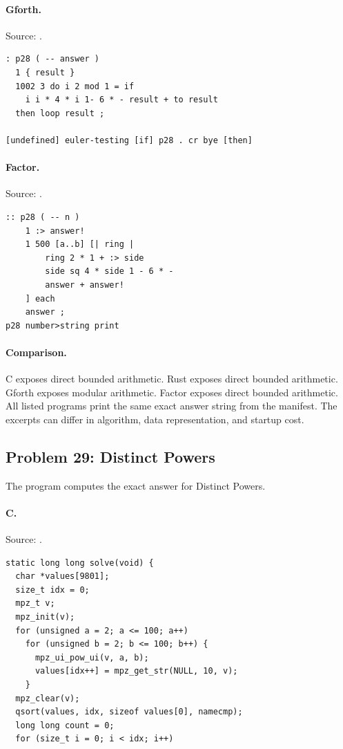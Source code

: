 \paragraph{Gforth.} Source: .
\begin{lstlisting}
: p28 ( -- answer )
  1 { result }
  1002 3 do i 2 mod 1 = if
    i i * 4 * i 1- 6 * - result + to result
  then loop result ;

[undefined] euler-testing [if] p28 . cr bye [then]
\end{lstlisting}

\paragraph{Factor.} Source: .
\begin{lstlisting}
:: p28 ( -- n )
    1 :> answer!
    1 500 [a..b] [| ring |
        ring 2 * 1 + :> side
        side sq 4 * side 1 - 6 * -
        answer + answer!
    ] each
    answer ;
p28 number>string print
\end{lstlisting}

\paragraph{Comparison.}
C exposes direct bounded arithmetic. Rust exposes direct bounded arithmetic. Gforth exposes modular arithmetic. Factor exposes direct bounded arithmetic.
All listed programs print the same exact answer string from the manifest. The excerpts can differ in algorithm, data representation, and startup cost.

\subsection{Problem 29: Distinct Powers}
\label{walkthrough:p29}
The program computes the exact answer for Distinct Powers.

\paragraph{C.} Source: .
\begin{lstlisting}
static long long solve(void) {
  char *values[9801];
  size_t idx = 0;
  mpz_t v;
  mpz_init(v);
  for (unsigned a = 2; a <= 100; a++)
    for (unsigned b = 2; b <= 100; b++) {
      mpz_ui_pow_ui(v, a, b);
      values[idx++] = mpz_get_str(NULL, 10, v);
    }
  mpz_clear(v);
  qsort(values, idx, sizeof values[0], namecmp);
  long long count = 0;
  for (size_t i = 0; i < idx; i++)
\end{lstlisting}


